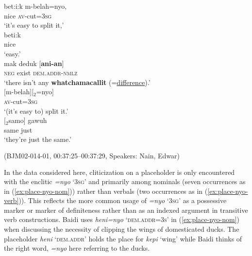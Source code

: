\documentclass[output=paper,colorlinks,citecolor=brown
\ChapterDOI{10.5281/zenodo.15697585}
]{langscibook}
\begin{document}
\begin{exe}
    \ex\label{ex:place-affix-nom} \begin{xlist}[0\quad →A:]
         \gll
        bet:i:k m-belah=nyo, \\
        nice \textsc{av}-cut=3\textsc{sg} \\
        \glt `it's easy to split it,' \\
         \gll
        beti:k \\
        nice \\
        \glt `easy.' \\
         \gll
        mak deduk [\textbf{ani-an}{]} \\
        \textsc{neg} exist \textsc{dem.addr}-\textsc{nmlz} \\
        \glt `there isn't any \textbf{whatchamacallit} (=\uline{difference}).' \\
         \gll
        \hspace{4.8em}[m-belah][$_2$=nyo] \\
        \hspace{4.8em}\textsc{av}-cut=3\textsc{sg} \\
        \glt\hspace{4.8em}`(it's easy to) split it.' \\
         \gll
        \hspace{8.5em}[$_2$samo] gawuh \\
        \hspace{8.5em}same just \\
        \glt\hspace{8.5em}`they're just the same.' \\
    \end{xlist}
    \hfill (BJM02-014-01, 00:37:25–00:37:29, Speakers: Nain, Edwar) 
\end{exe}

In the data considered here, cliticization on a placeholder is only encountered with the enclitic \textit{=nyo} `3\textsc{sg}' and primarily among nominals (seven occurrences as in (\ref{ex:place-nyo-nom})) rather than verbals (two occurrences as in (\ref{ex:place-nyo-verb})). This reflects the more common usage of \textit{=nyo} `3\textsc{sg}' as a possessive marker or marker of definiteness rather than as an indexed argument in transitive verb constructions. Baidi uses \textit{heni=nyo} `\textsc{dem.addr=3s}' in (\ref{ex:place-nyo-nom}) when discussing the necessity of clipping the wings of domesticated ducks. The placeholder \textit{heni} `\textsc{dem.addr}' holds the place for \textit{kepi} `wing' while Baidi thinks of the right word, \textit{=nyo} here referring to the ducks. 
\end{document}
